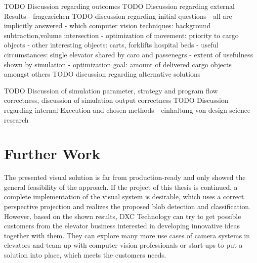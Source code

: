 TODO Discussion regarding outcomes
TODO Discussion regarding external Results - fragezeichen
TODO discussion regarding initial questions
 - all are implicitly answered
 - which computer vision techniques: background subtraction,volume intersection
 - optimization of movement: priority to cargo objects
 - other interesting objects: carts, forklifts hospital beds
 - useful circumstances: single elevator shared by caro and passenegrs
 - extent of usefulness shown by simulation
 - optimization goal: amount of delivered cargo objects amongst others
TODO discussion regarding alternative solutions
 
TODO Discussion of simulation parameter, strategy and program flow correctness, discussion of simulation output correctness
TODO  Discussion regarding internal Execution and chosen methods - einhaltung von design science research

\section{Further Work}

The presented visual solution is far from production-ready and only showed the general feasibility of the approach.
If the project of this thesis is continued, a complete implementation of the visual system is desirable, which uses a correct perspective projection and realizes the proposed blob detection and classification.
However, based on the shown results, DXC Technology can try to get possible customers from the elevator business interested in developing innovative ideas together with them.
They can explore many more use cases of camera systems in elevators and team up with computer vision professionals or start-ups to put a solution into place, which meets the customers needs.
